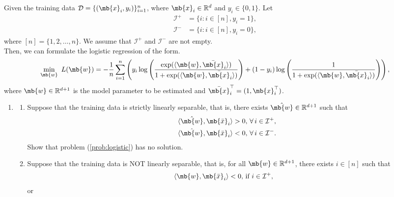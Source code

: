 \begin{exercise}
    Given the training data $\mathcal{D}=\{ (\mb{x}_i,y_i) \}_{i=1}^n$, where $\mb{x}_i \in \mathbb{R}^d$ and $y_i \in \{ 0,1 \}$. Let
    \begin{align*}
        \mathcal{I}^+ & =\{i:i\in[n],y_i=1\}, \\
        \mathcal{I}^- & =\{i:i\in[n],y_i=0\},
    \end{align*}
    where $[n]=\{1,2,\ldots,n\}$. We assume that $\mathcal{I}^+$ and $\mathcal{I}^-$ are not empty.\\
    Then, we can formulate the logistic regression of the form.
    \begin{equation}\label{prob:logistic}
        \min_{\mb{w}}\,\,L(\mb{w})=-\frac{1}{n}\sum_{i=1}^n \left( y_i \log \left( \frac{\exp(\langle \mb{w},  \bar{\mb{x}}_i \rangle)}{1+\exp(\langle \mb{w},  \bar{\mb{x}}_i \rangle) } \right) + (1-y_i)\log \left( \frac{1}{1+\exp(\langle \mb{w},  \bar{\mb{x}}_i \rangle)} \right) \right),
    \end{equation}
    where $\mb{w} \in \mathbb{R}^{d+1}$ is the model parameter to be estimated and $ \bar{\mb{x}}_i^{\top} = (1,\mb{x}_i^{\top}) $.
    \begin{enumerate}
        \item
            \begin{enumerate}
                \item Suppose that the training data is strictly linearly separable, that is, there exists $\hat{\mb{w}}\in\mathbb{R}^{d+1}$ such that
                    \begin{align*}
                         & \langle \hat{\mb{w}}, \mb{\bar{x}}_i\rangle>0,\,\forall\,i\in\mathcal{I}^+, \\
                         & \langle \hat{\mb{w}}, \mb{\bar{x}}_i\rangle<0,\,\forall\,i\in\mathcal{I}^-.
                    \end{align*}
                    Show that problem (\ref{prob:logistic}) has no solution.
                \item
                    Suppose that the training data is NOT linearly separable, that is, for all $\mb{w} \in \mathbb{R}^{d+1}$, there exists $ i \in \left[ n \right] $ such that
                    \begin{align*}
                         & \langle \mb{w}, \mb{\bar{x}}_i\rangle< 0,\,\text{if\ } i\in\mathcal{I}^+,
                    \end{align*}
                    or

\end{enumerate}
\end{enumerate}
\end{exercise}
